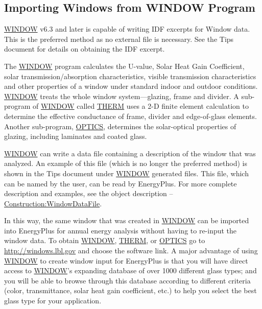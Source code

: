 \subsection{Importing Windows from WINDOW Program}\label{importing-windows-from-window-program}

\begin{callout}
\href{https://windows.lbl.gov/software-tools#window-heading}{WINDOW} v6.3 and later is capable of writing IDF excerpts for Window data. This is the preferred method as no external file is necessary. See the Tips document for details on obtaining the IDF excerpt.
\end{callout}

The \href{https://windows.lbl.gov/software-tools#window-heading}{WINDOW} program calculates the U-value, Solar Heat Gain Coefficient, solar transmission/absorption characteristics, visible transmission characteristics and other properties of a window under standard indoor and outdoor conditions. \href{https://windows.lbl.gov/software-tools#window-heading}{WINDOW} treats the whole window system---glazing, frame and divider. A sub-program of \href{https://windows.lbl.gov/software-tools#window-heading}{WINDOW} called \href{https://windows.lbl.gov/software-tools#therm-heading}{THERM} uses a 2-D finite element calculation to determine the effective conductance of frame, divider and edge-of-glass elements. Another sub-program, \href{https://windows.lbl.gov/software-tools#optics-heading}{OPTICS}, determines the solar-optical properties of glazing, including laminates and coated glass.

\href{https://windows.lbl.gov/software-tools#window-heading}{WINDOW} can write a data file containing a description of the window that was analyzed. An example of this file (which is no longer the preferred method) is shown in the Tips document under \href{https://windows.lbl.gov/software-tools#window-heading}{WINDOW} generated files. This file, which can be named by the user, can be read by EnergyPlus. For more complete description and examples, see the object description -- \hyperref[constructionwindowdatafile]{Construction:WindowDataFile}.

In this way, the same window that was created in \href{https://windows.lbl.gov/software-tools#window-heading}{WINDOW} can be imported into EnergyPlus for annual energy analysis without having to re-input the window data. To obtain \href{https://windows.lbl.gov/software-tools#window-heading}{WINDOW}, \href{https://windows.lbl.gov/software-tools#therm-heading}{THERM}, or \href{https://windows.lbl.gov/software-tools#optics-heading}{OPTICS} go to \url{http://windows.lbl.gov} and choose the software link. A major advantage of using \href{https://windows.lbl.gov/software-tools#window-heading}{WINDOW} to create window input for EnergyPlus is that you will have direct access to \href{https://windows.lbl.gov/software-tools#window-heading}{WINDOW}'s expanding database of over 1000 different glass types; and you will be able to browse through this database according to different criteria (color, transmittance, solar heat gain coefficient, etc.) to help you select the best glass type for your application.

